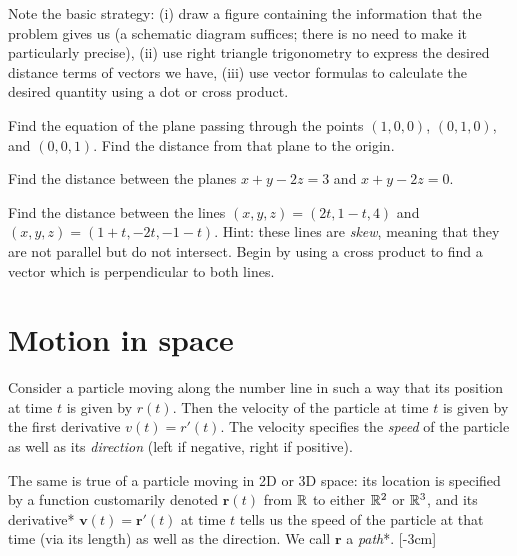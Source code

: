 \documentclass[svgnames]{watsonbook}
\begin{document}
Note the basic strategy: (i) draw a figure containing the information that
the problem gives us (a schematic diagram suffices; there is no need
to make it particularly precise), (ii) use right triangle trigonometry to
express the desired distance terms of vectors we have, (iii) use
vector formulas to calculate the desired quantity using a dot or cross
product. 

\begin{exercise}{}{}
  Find the equation of the plane passing through the points $(1,0,0)$,
  $(0,1,0)$, and $(0,0,1)$. Find the distance from that plane to the
  origin. 
\end{exercise}

\begin{exercise}{}{}
  Find the distance between the planes $x+y-2z = 3$ and $x+y-2z = 0$. 
\end{exercise}

\begin{exercise}{}{}
  Find the distance between the lines $(x,y,z) = (2t, 1-t, 4)$ and
  $(x,y,z) = (1 + t, -2t, -1-t)$. Hint: these lines are \textit{skew},
  meaning that they are not parallel but do not intersect. Begin by
  using a cross product to find a vector which is perpendicular to
  both lines. 
\end{exercise}

\section{Motion in space} \label{sec:motion_in_space} 

Consider a particle moving along the number line in such a way that
its position at time $t$ is given by $r(t)$. Then the velocity of the
particle at time $t$ is given by the first derivative $v(t) =
r'(t)$. The velocity specifies the \textit{speed} of the particle as well as
its \textit{direction} (left if negative, right if positive).

The same is true of a particle moving in 2D or 3D space: its location
is specified by a function customarily denoted $\mathbf{r}(t)$ from
$\mathbb{R}$ to either $\mathbb{R}^2$ or $\mathbb{R}^3$, and its derivative*
$\mathbf{v}(t) = \mathbf{r}'(t)$ at time $t$ tells us the speed of the
particle at that time (via its length) as well as the direction. We
call $\mathbf{r}$ a \textit{path}*. [-3cm] 
\end{document}
